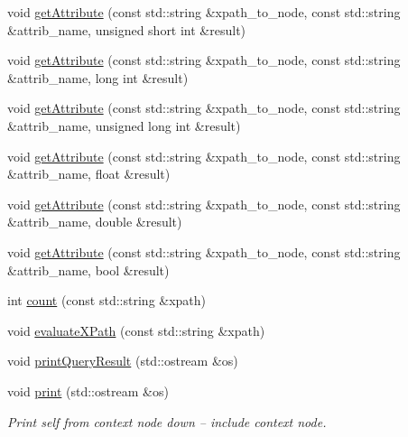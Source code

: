 \begin{DoxyCompactItemize}
\item 
void \mbox{\hyperlink{classXMLXPathReader_1_1BasicXPathReader_ae8e03dee5844b1e76d68ce1c57381604}{get\+Attribute}} (const std\+::string \&xpath\+\_\+to\+\_\+node, const std\+::string \&attrib\+\_\+name, unsigned short int \&result)
\item 
void \mbox{\hyperlink{classXMLXPathReader_1_1BasicXPathReader_aadf453a161c7a3cacbe965e9f0e30031}{get\+Attribute}} (const std\+::string \&xpath\+\_\+to\+\_\+node, const std\+::string \&attrib\+\_\+name, long int \&result)
\item 
void \mbox{\hyperlink{classXMLXPathReader_1_1BasicXPathReader_ab109aaf673ecf809456c7f070e4cb046}{get\+Attribute}} (const std\+::string \&xpath\+\_\+to\+\_\+node, const std\+::string \&attrib\+\_\+name, unsigned long int \&result)
\item 
void \mbox{\hyperlink{classXMLXPathReader_1_1BasicXPathReader_a3ecaa8daeea68550a62ab5696141a039}{get\+Attribute}} (const std\+::string \&xpath\+\_\+to\+\_\+node, const std\+::string \&attrib\+\_\+name, float \&result)
\item 
void \mbox{\hyperlink{classXMLXPathReader_1_1BasicXPathReader_a0cee8b6f9d3b93f7d6b37e00496a2667}{get\+Attribute}} (const std\+::string \&xpath\+\_\+to\+\_\+node, const std\+::string \&attrib\+\_\+name, double \&result)
\item 
void \mbox{\hyperlink{classXMLXPathReader_1_1BasicXPathReader_a1683b972697031650a14b0bca5828338}{get\+Attribute}} (const std\+::string \&xpath\+\_\+to\+\_\+node, const std\+::string \&attrib\+\_\+name, bool \&result)
\item 
int \mbox{\hyperlink{classXMLXPathReader_1_1BasicXPathReader_a2f1d474c6ff8160f210295f0d3671204}{count}} (const std\+::string \&xpath)
\item 
void \mbox{\hyperlink{classXMLXPathReader_1_1BasicXPathReader_a0d2f7c3da72b0669541bef2e1d35f973}{evaluate\+X\+Path}} (const std\+::string \&xpath)
\item 
void \mbox{\hyperlink{classXMLXPathReader_1_1BasicXPathReader_a719ba9bbd4ae77d6be9a6544a2d0ccaf}{print\+Query\+Result}} (std\+::ostream \&os)
\item 
void \mbox{\hyperlink{classXMLXPathReader_1_1BasicXPathReader_a846e0ac9b2835040cb615a9585e2a999}{print}} (std\+::ostream \&os)
\begin{DoxyCompactList}\small\item\em Print self from context node down -- include context node. \end{DoxyCompactList}\item 

\end{DoxyCompactItemize}
